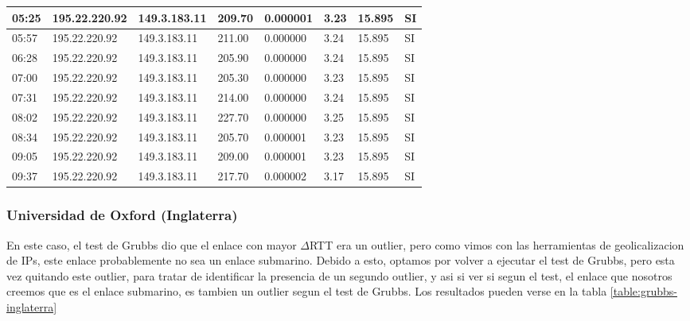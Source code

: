 \begin{table}[H]
\begin{tabular}{|l|l|l|l|l|l|l|l|}
05:25 & 195.22.220.92 & 149.3.183.11 & 209.70 & 0.000001 & 3.23 & 15.895 & SI \\ \hline
05:57 & 195.22.220.92 & 149.3.183.11 & 211.00 & 0.000000 & 3.24 & 15.895 & SI \\ \hline
06:28 & 195.22.220.92 & 149.3.183.11 & 205.90 & 0.000000 & 3.24 & 15.895 & SI \\ \hline
07:00 & 195.22.220.92 & 149.3.183.11 & 205.30 & 0.000000 & 3.23 & 15.895 & SI \\ \hline
07:31 & 195.22.220.92 & 149.3.183.11 & 214.00 & 0.000000 & 3.24 & 15.895 & SI \\ \hline
08:02 & 195.22.220.92 & 149.3.183.11 & 227.70 & 0.000000 & 3.25 & 15.895 & SI \\ \hline
08:34 & 195.22.220.92 & 149.3.183.11 & 205.70 & 0.000001 & 3.23 & 15.895 & SI \\ \hline
09:05 & 195.22.220.92 & 149.3.183.11 & 209.00 & 0.000001 & 3.23 & 15.895 & SI \\ \hline
09:37 & 195.22.220.92 & 149.3.183.11 & 217.70 & 0.000002 & 3.17 & 15.895 & SI \\ \hline
	\end{tabular}
\end{table}

\subsubsection{Universidad de Oxford (Inglaterra)}

En este caso, el test de Grubbs dio que el enlace con mayor $\Delta$RTT era un outlier, pero como vimos con las herramientas de geolicalizacion de IPs, este enlace probablemente no sea un enlace submarino. Debido a esto, optamos por volver a ejecutar el test de Grubbs, pero esta vez quitando este outlier, para tratar de identificar la presencia de un segundo outlier, y asi si ver si segun el test, el enlace que nosotros creemos que es el enlace submarino, es tambien un outlier segun el test de Grubbs. Los resultados pueden verse en la tabla \ref{table:grubbs-inglaterra}

